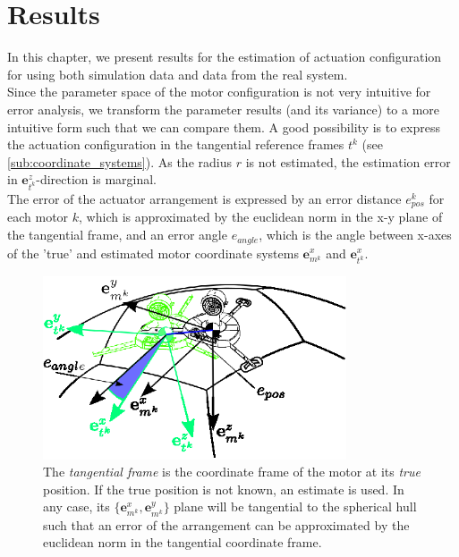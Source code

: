 \chapter{Results}
\label{chap:simulation_results}
In this chapter, we present results for the estimation of actuation configuration for using both simulation data and data from the real system. \\

Since the parameter space of the motor configuration is not very intuitive for error analysis,
we transform the parameter results (and its variance) to a more intuitive form such that we can compare them.
A good possibility is to express the actuation configuration in the tangential reference frames $t^k$ (see \cref{sub:coordinate_systems}).
As the radius $r$ is not estimated, the estimation error in
$ \mathbf{e}_{t^k}^z $-direction is marginal.
\\
The error of the actuator arrangement is expressed by an error distance $e_{pos}^k$ for each motor $k$, which is approximated by the euclidean norm in the x-y plane of the tangential frame,
and an error angle $e_{angle}$, which is the angle between x-axes of the 'true' and estimated motor coordinate systems $\mathbf{e}_{m^k}^x$ and $\mathbf{e}_{t^k}^x$.

\begin{figure}[hbtp]
\centering
\includegraphics[width = 0.8\textwidth]{images/tangential_frame.eps}
\caption{The \textit{tangential frame} is the coordinate frame of the motor at its \textit{true} position. If the true position is not known, an estimate is used. In any case, its $\lbrace \mathbf{e}^x_{m^k} , \mathbf{e}^y_{m^k} \rbrace$ plane will be tangential to the spherical hull such that an error of the arrangement can be approximated by the euclidean norm in the tangential coordinate frame.}
\label{fig:tangential_frame}
\end{figure}

